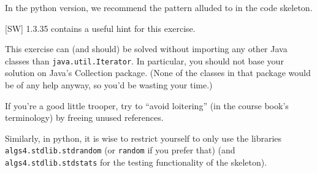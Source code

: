 \documentclass{tufte-handout}
\begin{document}
In the python version, we recommend the pattern alluded to in the code skeleton.

[SW] 1.3.35 contains a useful hint for this exercise.

This exercise can (and should) be solved without importing any other
Java classes than {\tt java.util.Iterator}.
In particular, you should not base your solution on Java's Collection
package.
(None of the classes in that package would be of any help anyway, so
you'd be wasting your time.)

If you're a good little trooper, try to ``avoid loitering'' (in the course book's terminology) by freeing
unused references. 

Similarly, in python, it is wise to restrict yourself to only use the libraries {\tt algs4.stdlib.stdrandom} (or {\tt random} if you prefer that) (and {\tt algs4.stdlib.stdstats} for the testing functionality of the skeleton). 
 
\newpage 
\end{document}
